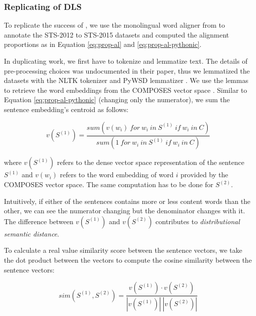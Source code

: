 \subsubsection{Replicating of DLS}

To replicate the success of \cite{sultan2014dls}, we use the monolingual word aligner from \cite{sultan2014back} to annotate the STS-2012 to STS-2015 datasets and computed the alignment proportions as in Equation \eqref{eq:prop-al} and \eqref{eq:prop-al-pythonic}.

In duplicating \cite{sultan2015dls} work, we first have to tokenize and lemmatize text. The details of pre-processing choices was undocumented in their paper, thus we lemmatized the datasets with the NLTK tokenizer \citep{bird2009natural} and PyWSD lemmatizer \citep{pywsd14}. We use the lemmas to retrieve the word embeddings from the COMPOSES vector space \citep{baroni2014composes}. Similar to Equation \eqref{eq:prop-al-pythonic} (changing only the numerator), we sum the sentence embedding's centroid as follows:

\vspace{-5mm}

\begin{equation}
v(S_{  }^{ (1) })=\frac { sum(v({ w }_{ i }) \ for \ { w }_{ i } \ in  \ { S }^{ (1) } \  if \ { w }_{ i } \ in  \ C) }{ sum(1 \ for \ { w }_{ i } \ in \ { S }^{ (1) } \ if \ { w }_{ i } \ in \ C) } 
\end{equation}

where $v(S_{  }^{ (1) })$ refers to the dense vector space representation of the sentence $S_{  }^{ (1) }$ and $v({ w }_{ i })$ refers to the word embedding of word $i$ provided by the COMPOSES vector space. The same computation has to be done for $S_{  }^{ (2) }$.

Intuitively, if either of the sentences contains more or less content words than the other, we can see the numerator changing but the denominator changes with it. The difference between $v(S_{  }^{ (1) })$ and $v(S_{  }^{ (2) })$ contributes to \emph{distributional semantic distance}. 

To calculate a real value similarity score between the sentence vectors, we take the dot product between the vectors to compute the cosine similarity between the sentence vectors:

\vspace{-2mm}

\begin{equation}
sim({ S }_{  }^{ (1) },{ S }_{  }^{ (2) })=\frac { v(S_{  }^{ (1) })\cdot v(S_{  }^{ (2) }) }{ |v(S_{  }^{ (1) })| \ |v(S_{  }^{ (2) })|  } 
\end{equation}

